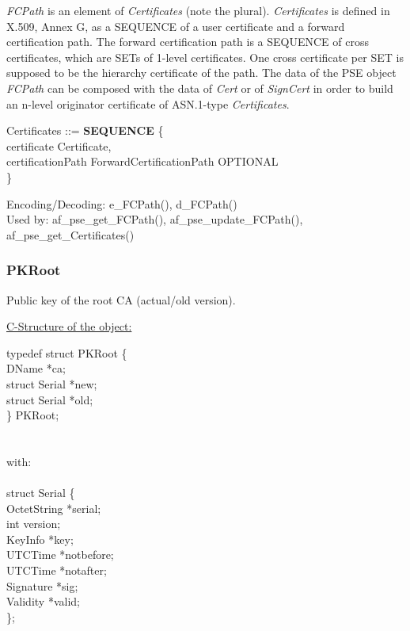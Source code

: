 {\em FCPath} is an element of {\em Certificates} (note the plural).
{\em Certificates} is defined in X.509, Annex G,
as a SEQUENCE of a user certificate and a forward certification path.
The forward certification path is a SEQUENCE of cross certificates,
which are SETs of 1-level certificates.
One cross certificate per SET is supposed to be
the hierarchy certificate of the path.
The data of the PSE object {\em FCPath}
can be composed with the data of
{\em Cert} or of
{\em SignCert} in order to build an
n-level originator certificate of ASN.1-type {\em Certificates}.

{\small
\bvtab
\1 Certificates ::= \3 {\bf SEQUENCE} \{   \\
\5 certificate          \4 Certificate,                \\
\5 certificationPath    \4 ForwardCertificationPath OPTIONAL   \\
\4 \}
\evtab
}

Encoding/Decoding: e\_FCPath(), d\_FCPath() \\
Used by: af\_pse\_get\_FCPath(), af\_pse\_update\_FCPath(), af\_pse\_get\_Certificates()

\subsubsection{PKRoot}
Public key of the root CA (actual/old version).

\underline{C-Structure of the object:}

{\small
\bvtab
\4      typedef struct PKRoot \{ \\
\6              DName          \3 *ca; \\
\6              struct Serial \3 *new; \\
\6              struct Serial \3 *old; \\
\4      \} PKRoot;  \\ \\ \\
with: \\ \\
\4      struct Serial \{ \\
\6             OctetString    \3 *serial; \\
\6             int            \3 version; \\
\6             KeyInfo        \3 *key; \\
\6             UTCTime        \3 *notbefore; \\
\6             UTCTime        \3 *notafter; \\
\6             Signature      \3 *sig; \\
\6             Validity       \3 *valid; \\
\4      \}; \\
\evtab
}


